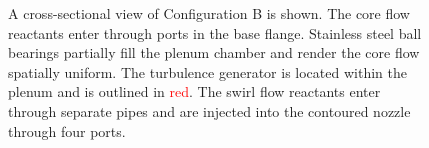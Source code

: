 \begin{figure}

\caption[Detail schematic of configuration B]{A cross-sectional view of Configuration B is shown. The core flow reactants enter through ports in the base flange. Stainless steel ball bearings partially fill the plenum chamber and render the core flow spatially uniform. The turbulence generator is located within the plenum and is outlined in \textcolor{red}{red}. The swirl flow reactants enter through separate pipes and are injected into the contoured nozzle through four ports.}

\label{fig:lsbB}

\end{figure}

